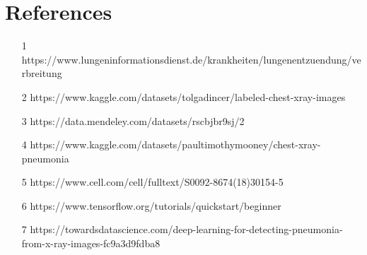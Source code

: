 \documentclass{article}
\begin{document}
\section{References}
\begin{enumerate}
  \item [1] https://www.lungeninformationsdienst.de/krankheiten/lungenentzuendung/verbreitung
  \item [2] https://www.kaggle.com/datasets/tolgadincer/labeled-chest-xray-images
  \item [3] https://data.mendeley.com/datasets/rscbjbr9sj/2
  \item [4] https://www.kaggle.com/datasets/paultimothymooney/chest-xray-pneumonia
  \item [5] https://www.cell.com/cell/fulltext/S0092-8674(18)30154-5
  \item [6] https://www.tensorflow.org/tutorials/quickstart/beginner
  \item [7] https://towardsdatascience.com/deep-learning-for-detecting-pneumonia-from-x-ray-images-fc9a3d9fdba8
\end{enumerate}
\end{document}
